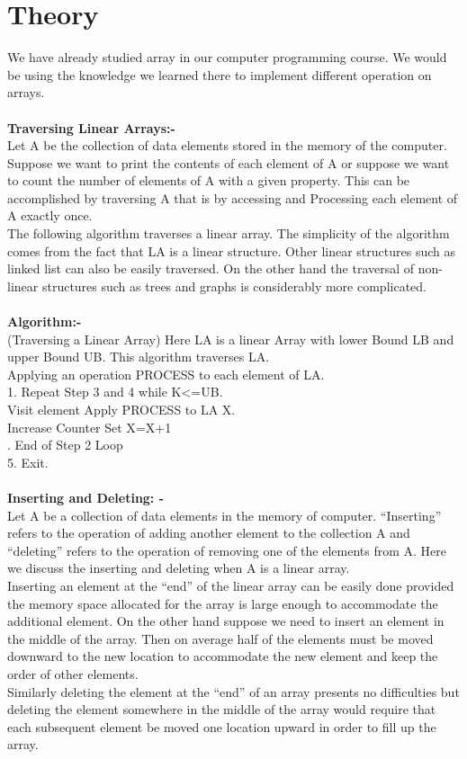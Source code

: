 \documentclass[11pt]{article}            %
\begin{document}
\section{Theory }              
We have already studied array in our computer programming course. We would be using the knowledge we learned there to implement different operation on arrays. \\  \\
\textbf{Traversing Linear Arrays:- }\\ 
Let A be the collection of data elements stored in the memory of the computer. Suppose we want to print the contents of each element of A or suppose we want to count the number of elements of A with a given property. This can be accomplished by traversing A that is by accessing and Processing each element of A exactly once.  \\
The following algorithm traverses a linear array.  The simplicity of the algorithm comes from the fact that LA is a linear structure. Other linear structures such as linked list can also be easily traversed. On the other hand the traversal of non-linear structures such as trees and graphs is considerably more complicated.  \\ \\
\textbf{Algorithm:- }\\
(Traversing a Linear Array) Here LA is a linear Array with lower Bound LB and upper Bound UB.  This algorithm traverses LA.\\
Applying an operation PROCESS to each element of LA. \\
1. Repeat Step 3 and 4 while K<=UB.\\ Visit element Apply PROCESS to LA X.\\ Increase Counter Set X=X+1\\. End of Step 2 Loop\\ 5. Exit. \\ \\

\textbf{Inserting and Deleting: - }\\
Let A be a collection of data elements in the memory of computer. “Inserting” refers to the operation of adding another element to the collection A and “deleting” refers to the operation of removing one of the elements from A. Here we discuss the inserting and deleting when A is a linear array. \\
Inserting an element at the “end” of the linear array can be easily done provided the memory space allocated for the array is large enough to accommodate the additional element. On the other hand suppose we need to insert an element in the middle of the array. Then on average half of the elements must be moved downward to the new location to accommodate the new element and keep the order of other elements.\\
Similarly deleting the element at the “end” of an array presents no difficulties but deleting the element somewhere in the middle of the array would require that each subsequent element be moved one location upward in order to fill up the array.\\ \\
\end{document}
